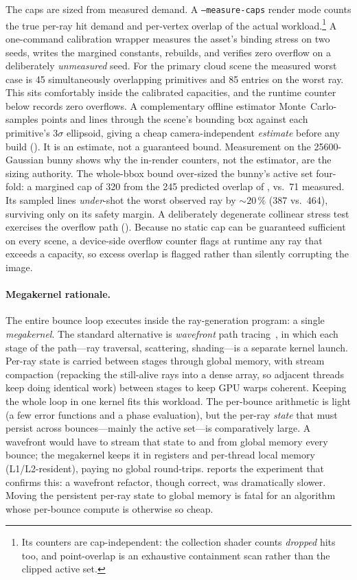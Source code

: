 The caps are sized from measured demand. A \texttt{--measure-caps} render mode counts the
true per-ray hit demand and per-vertex overlap of the actual workload.\footnote{Its counters are
cap-independent: the collection shader counts \emph{dropped} hits too, and point-overlap is an
exhaustive containment scan rather than the clipped active set.} A one-command calibration wrapper
measures the asset's binding stress on two seeds, writes the margined constants, rebuilds, and
verifies zero overflow on a deliberately \emph{unmeasured} seed. For the primary cloud scene the
measured worst case is \num{45} simultaneously overlapping primitives and \num{85} entries on the
worst ray. This sits comfortably inside
the calibrated capacities, and the runtime counter below records zero overflows. A complementary
offline estimator Monte~Carlo-samples points and lines through the scene's bounding box against each
primitive's $3\sigma$ ellipsoid, giving a cheap camera-independent \emph{estimate} before any build
(). It is an estimate, not a guaranteed bound. Measurement on the \num{25600}-Gaussian
bunny shows why the in-render counters, not the estimator, are the sizing authority. The whole-bbox
bound over-sized the bunny's active set four-fold: a margined cap of \num{320} from the \num{245}
predicted overlap of , vs.\ \num{71} measured. Its sampled lines \emph{under}-shot the
worst observed ray by ${\sim}20\,\%$ (\num{387} vs.\ \num{464}), surviving only on its safety margin.
A deliberately degenerate collinear stress test
exercises the overflow path (). Because no static cap can be guaranteed sufficient
on every scene, a device-side overflow counter flags at runtime any ray that exceeds a capacity, so
excess overlap is flagged rather than silently corrupting the image.

\paragraph{Megakernel rationale.} The entire bounce loop executes inside the ray-generation program: a
single \emph{megakernel}. The standard alternative is \emph{wavefront} path tracing~\cite{Laine2013},
in which each stage of the path---ray traversal, scattering, shading---is a separate kernel launch.
Per-ray state is carried between stages through global memory, with stream compaction
(repacking the still-alive rays into a dense array, so adjacent threads keep doing
identical work) between stages to
keep GPU warps coherent. Keeping the whole loop in one kernel fits this workload. The per-bounce arithmetic is light (a few
error functions and a phase evaluation), but the per-ray \emph{state} that must persist across
bounces---mainly the active set---is comparatively large. A wavefront would have to stream that state
to and from global memory every bounce; the megakernel keeps it in registers and per-thread local memory
(L1/L2-resident), paying no global round-trips.  reports the experiment that confirms this: a wavefront
refactor, though correct, was dramatically slower. Moving the persistent per-ray state to
global memory is fatal for an algorithm whose per-bounce compute is otherwise so cheap.

